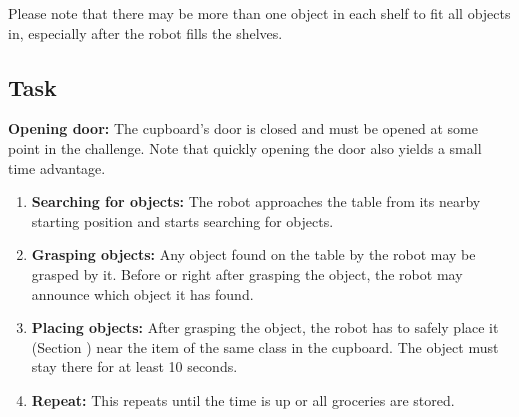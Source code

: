 Please note that there may be more than one object in each shelf to fit all objects in, especially after the robot fills the shelves. 

\subsection{Task}
\textbf{Opening door:} The cupboard's door is closed and must be opened at some point in the challenge. Note that quickly opening the door also yields a small time advantage.
\begin{enumerate}
\item \textbf{Searching for objects:} The robot approaches the table from its nearby starting position and starts searching for objects. 
\item \textbf{Grasping objects:} Any object found on the table by the robot may be grasped by it. 
  Before or right after grasping the object, the robot may announce which object it has found. 
\item \textbf{Placing objects:} After grasping the object, the robot has to safely place it (Section ) near the item of the same class in the cupboard. 
  The object must stay there for at least 10 seconds.
\item \textbf{Repeat:} This repeats until the time is up or all groceries are stored. 
\end{enumerate}

